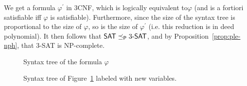 \begin{example}
    We get a formula \(\varphi^\prime\) in 3CNF, which is logically equivalent to\(\varphi\) (and is a fortiori satisfiable iff \(\varphi\) is satisfiable). Furthermore, since the size of the syntax tree is proportional to the size of \(\varphi\), so is the size of \(\varphi^\prime\) (i.e. this reduction is in deed polynomial). It then follows that
    \(\textsf{SAT} \preceq_\textsf{P} 3\textsf{-SAT}\), and by Proposition~\ref{prop:ple-nph}, that 3-\textsf{SAT} is \textsf{NP}-complete.
    \begin{figure}
        \begin{center}
        \end{center}
        \caption{Syntax tree of the formula \(\varphi\)}
        \label{fig:3sat-npc-syntax-tree}
    \end{figure}

    \begin{figure}
        \begin{center}
        \end{center}
        \caption{Syntax tree of Figure~\ref{fig:3sat-npc-syntax-tree} labeled with new variables.}
        \label{fig:3sat-npc-var-tree}
    \end{figure}
\end{example}

